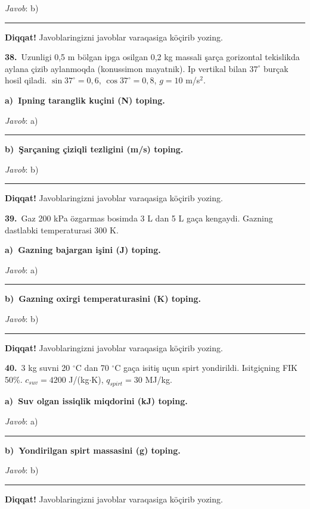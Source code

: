 \documentclass[11pt,a4paper]{article}
\newcommand{\blank}{\rule{5cm}{0.4pt}}
\begin{document}
\noindent\textit{Javob}: b)\ \blank\par
\medskip\noindent\textbf{Diqqat!} Javoblaringizni javoblar varaqasiga köçirib yozing.\par\vspace{10pt}
\noindent\textbf{38.}\ Uzunligi 0,5 m bölgan ipga osilgan 0,2 kg massali şarça gorizontal tekislikda aylana çizib aylanmoqda (konussimon mayatnik). Ip vertikal bilan $37^\circ$ burçak hosil qiladi. $\sin37^\circ=0{,}6$, $\cos37^\circ=0{,}8$, $g=10$ m/s$^2$.\par\smallskip
\medskip\noindent\textbf{a)\ Ipning taranglik kuçini (N) toping.}\par
\noindent\textit{Javob}: a)\ \blank\par
\medskip\noindent\textbf{b)\ Şarçaning çiziqli tezligini (m/s) toping.}\par
\noindent\textit{Javob}: b)\ \blank\par
\medskip\noindent\textbf{Diqqat!} Javoblaringizni javoblar varaqasiga köçirib yozing.\par\vspace{10pt}
\noindent\textbf{39.}\ Gaz 200 kPa özgarmas bosimda 3 L dan 5 L gaça kengaydi. Gazning dastlabki temperaturasi 300 K.\par\smallskip
\medskip\noindent\textbf{a)\ Gazning bajargan işini (J) toping.}\par
\noindent\textit{Javob}: a)\ \blank\par
\medskip\noindent\textbf{b)\ Gazning oxirgi temperaturasini (K) toping.}\par
\noindent\textit{Javob}: b)\ \blank\par
\medskip\noindent\textbf{Diqqat!} Javoblaringizni javoblar varaqasiga köçirib yozing.\par\vspace{10pt}
\noindent\textbf{40.}\ 3 kg suvni 20 $^\circ$C dan 70 $^\circ$C gaça isitiş uçun spirt yondirildi. Isitgiçning FIK 50\%. $c_{suv}=4200$ J/(kg$\cdot$K), $q_{spirt}=30$ MJ/kg.\par\smallskip
\medskip\noindent\textbf{a)\ Suv olgan issiqlik miqdorini (kJ) toping.}\par
\noindent\textit{Javob}: a)\ \blank\par
\medskip\noindent\textbf{b)\ Yondirilgan spirt massasini (g) toping.}\par
\noindent\textit{Javob}: b)\ \blank\par
\medskip\noindent\textbf{Diqqat!} Javoblaringizni javoblar varaqasiga köçirib yozing.\par\vspace{10pt}
\end{document}
